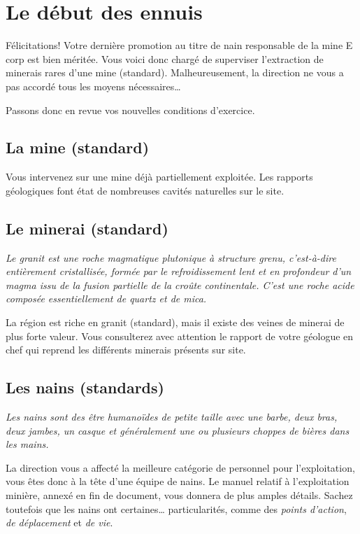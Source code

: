 
\newpage

\section{Le début des ennuis}

  Félicitations! Votre dernière promotion au titre de nain responsable de la
  mine E corp est bien méritée. Vous voici donc chargé de superviser
  l'extraction de minerais rares d'une mine (standard). Malheureusement, la
  direction ne vous a pas accordé tous les moyens nécessaires\ldots{}

  Passons donc en revue vos nouvelles conditions d'exercice.

\subsection{La mine (standard)}

  Vous intervenez sur une mine déjà partiellement exploitée. Les rapports
  géologiques font état de nombreuses cavités naturelles sur le site.

\subsection{Le minerai (standard)}

  \textit{Le granit est une roche magmatique plutonique à structure grenu,
  c'est-à-dire entièrement cristallisée, formée par le refroidissement lent et
  en profondeur d'un magma issu de la fusion partielle de la croûte
  continentale.  C'est une roche acide composée essentiellement de quartz et de
  mica.}

  La région est riche en granit (standard), mais il existe des veines de
  minerai de plus forte valeur. Vous consulterez avec attention le rapport de
  votre géologue en chef qui reprend les différents minerais présents sur site.

\subsection{Les nains (standards)}

  \textit{Les nains sont des être humanoïdes de petite taille avec une barbe,
  deux bras, deux jambes, un casque et généralement une ou plusieurs choppes de
  bières dans les mains.}

  La direction vous a affecté la meilleure catégorie de personnel pour
  l'exploitation, vous êtes donc à la tête d'une équipe de nains. Le manuel
  relatif à l'exploitation minière, annexé en fin de document, vous donnera de
  plus amples détails. Sachez toutefois que les nains ont certaines\ldots{}
  particularités, comme des \textit{points d'action}, \textit{de déplacement}
  et \textit{de vie}.

